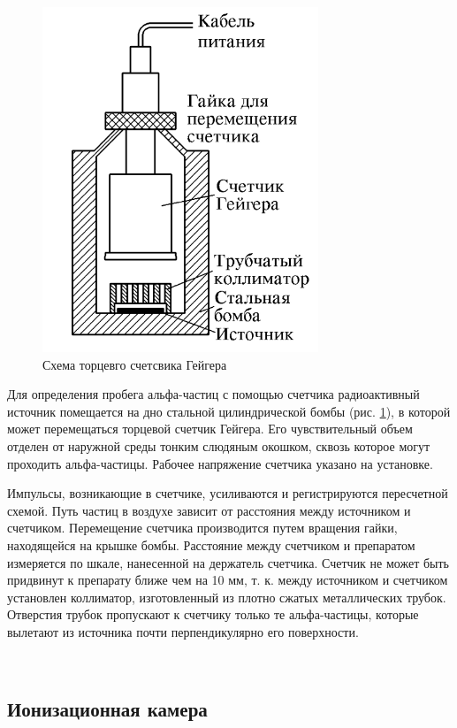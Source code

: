 \documentclass[a4paper]{article}
\begin{document}
\begin{figure}
    \includegraphics[scale = 0.7]{risgeyger.png}
    \caption{Схема торцевго счетсвика Гейгера}
    \label{ris geyger}
\end{figure}

Для определения пробега альфа-частиц с помощью счетчика радиоактивный источник помещается на дно стальной цилиндрической бомбы
(рис. \ref{ris geyger}), в которой может перемещаться торцевой счетчик Гейгера. Его
чувствительный объем отделен от наружной среды тонким слюдяным
окошком, сквозь которое могут проходить альфа-частицы. Рабочее напряжение счетчика указано на установке. \par  

Импульсы, возникающие в счетчике, усиливаются и регистрируются пересчетной схемой. Путь частиц в воздухе зависит от расстояния между источником и счетчиком. Перемещение счетчика производится путем вращения гайки, находящейся на крышке бомбы. Расстояние
между счетчиком и препаратом измеряется по шкале, нанесенной на
держатель счетчика. Счетчик не может быть придвинут к препарату ближе чем на 10 мм, т. к. между источником и счетчиком установлен коллиматор, изготовленный из плотно сжатых металлических трубок. Отверстия трубок пропускают к счетчику только те альфа-частицы, которые вылетают из источника почти перпендикулярно его поверхности.

\
\

\subsection{Ионизационная камера}
\end{document}
